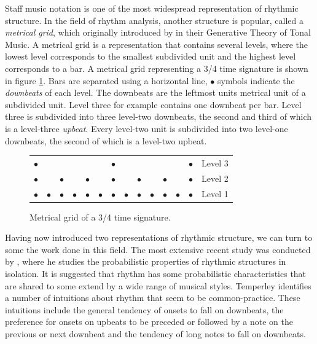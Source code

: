 Staff music notation is one of the most widespread representation of rhythmic structure. In the field of rhythm analysis, another structure is popular, called a \textit{metrical grid}, which originally introduced by \citet{lerdahl1983generative} in their Generative Theory of Tonal Music. A metrical grid is a representation that contains several levels, where the lowest level corresponds to the smallest subdivided unit and the highest level corresponds to a bar. A metrical grid representing a 3/4 time signature is shown in figure \ref{fig:grid}. Bars are separated using a horizontal line, $\bullet$ symbols indicate the \textit{downbeats} of each level. The downbeats are the leftmost units metrical unit of a subdivided unit. Level three for example contains one downbeat per bar. Level three is subdivided into three level-two downbeats, the second and third of which is a level-three \textit{upbeat}. Every level-two unit is subdivided into two level-one downbeats, the second of which is a level-two upbeat. 

\begin{figure}[b]
\centering
\hspace{2in}
\setlength{\extrarowheight}{-10.5pt}
\begin{tabular}{llllll|llllll|ll}
$\bullet$ &  &  &  &  &  & 		$\bullet$ &  &  &  &  &  & $\bullet$ & Level 3\\ 
$\bullet$ &  & 	$\bullet$ &  & 	$\bullet$ & & 	$\bullet$ & & $\bullet$ &  & $\bullet$ &  & $\bullet$ & Level 2\\
$\bullet$ & 		$\bullet$ & 		$\bullet$ & 		$\bullet$ & $\bullet$ & $\bullet$ & $\bullet$ & $\bullet$ & $\bullet$ & $\bullet$ & $\bullet$ & $\bullet$ & $\bullet$ & Level 1\\
\end{tabular}
\caption{Metrical grid of a 3/4 time signature.}
\label{fig:grid}
\end{figure}

Having now introduced two representations of rhythmic structure, we can turn to some the work done in this field. The most extensive recent study was conducted by \cite{temperley2010modeling}, where he studies the probabilistic properties of rhythmic structures in isolation. It is suggested that rhythm has some probabilistic characteristics that are shared to some extend by a wide range of musical styles. Temperley identifies a number of intuitions about rhythm that seem to be common-practice. These intuitions include the general tendency of onsets to fall on downbeats, the preference for onsets on upbeats to be preceded or followed by a note on the previous or next downbeat and the tendency of long notes to fall on downbeats. 

